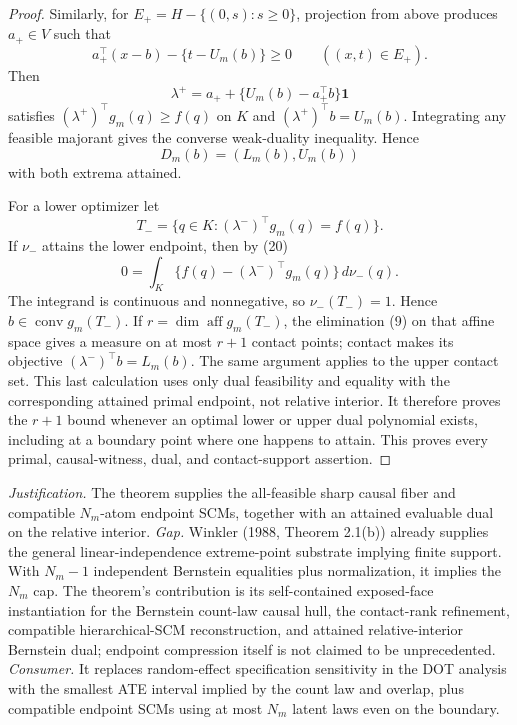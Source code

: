 \documentclass{article}
\begin{document}
\begin{proof}
Similarly, for \(E_+=H-\{(0,s):s\geq0\}\), projection from above produces \(a_+\in V\) such that
\[
 a_+^{\top}(x-b)-\{t-U_m(b)\}\geq0\qquad((x,t)\in E_+).
\]
Then
\[
 \lambda^+=a_++\{U_m(b)-a_+^{\top}b\}\mathbf1
\tag{22}
\]
satisfies \((\lambda^+)^{\top}g_m(q)\geq f(q)\) on \(K\) and \((\lambda^+)^{\top}b=U_m(b)\).  Integrating any feasible majorant gives the converse weak-duality inequality.  Hence
\[
 D_m(b)=(L_m(b),U_m(b))
\tag{23}
\]
with both extrema attained.

For a lower optimizer let
\[
 T_-=\{q\in K:(\lambda^-)^{\top}g_m(q)=f(q)\}.
\]
If \(\nu_-\) attains the lower endpoint, then by (20)
\[
 0=\int_K\{f(q)-(\lambda^-)^{\top}g_m(q)\}\,d\nu_-(q).
\]
The integrand is continuous and nonnegative, so \(\nu_-(T_-)=1\).  Hence \(b\in\operatorname{conv}g_m(T_-)\).  If \(r=\dim\operatorname{aff}g_m(T_-)\), the elimination (9) on that affine space gives a measure on at most \(r+1\) contact points; contact makes its objective \((\lambda^-)^{\top}b=L_m(b)\).  The same argument applies to the upper contact set.  This last calculation uses only dual feasibility and equality with the corresponding attained primal endpoint, not relative interior.  It therefore proves the \(r+1\) bound whenever an optimal lower or upper dual polynomial exists, including at a boundary point where one happens to attain.  This proves every primal, causal-witness, dual, and contact-support assertion.
\end{proof}
\par\smallskip\noindent \textit{Justification.} The theorem supplies the all-feasible sharp causal fiber and compatible \(N_m\)-atom endpoint SCMs, together with an attained evaluable dual on the relative interior. \textit{Gap.} Winkler (1988, Theorem 2.1(b)) already supplies the general linear-independence extreme-point substrate implying finite support.  With \(N_m-1\) independent Bernstein equalities plus normalization, it implies the \(N_m\) cap.  The theorem's contribution is its self-contained exposed-face instantiation for the Bernstein count-law causal hull, the contact-rank refinement, compatible hierarchical-SCM reconstruction, and attained relative-interior Bernstein dual; endpoint compression itself is not claimed to be unprecedented. \textit{Consumer.} It replaces random-effect specification sensitivity in the DOT analysis with the smallest ATE interval implied by the count law and overlap, plus compatible endpoint SCMs using at most \(N_m\) latent laws even on the boundary.
\end{document}
